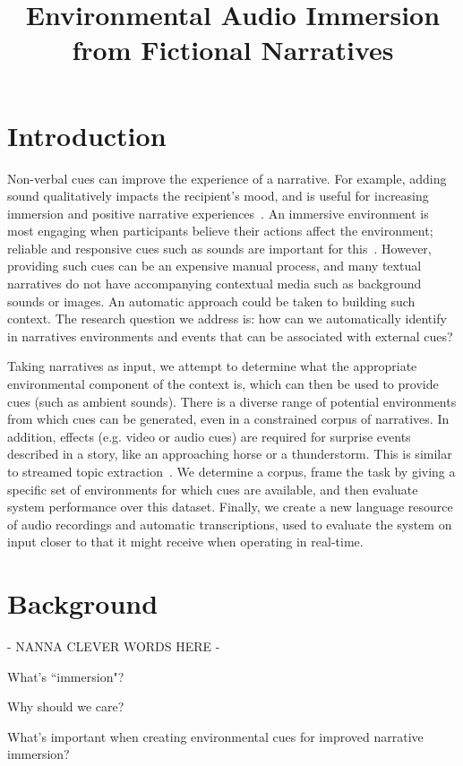 \documentclass[10pt,a4paper]{article}
\title{Environmental Audio Immersion from Fictional Narratives}
\begin{document}
\maketitleabstract

\section{Introduction}

Non-verbal cues can improve the experience of a narrative. 
For example, adding sound qualitatively impacts the recipient's mood, and is useful for increasing immersion and positive narrative experiences~\cite{ermi2005fundamental,madden2009collaborative,huiberts2010captivating}.
An immersive environment is most engaging when participants believe their actions affect the environment; reliable and responsive cues such as sounds are important for this~\cite{bobick1999kidsroom}.
However, providing such cues can be an expensive manual process, and many textual narratives do not have accompanying contextual media such as background sounds or images.
An automatic approach could be taken to building such context.
The research question we address is: how can we automatically identify in narratives environments and events that can be associated with external cues?

Taking narratives as input, we attempt to determine what the appropriate environmental component of the context is, which can then be used to provide cues (such as ambient sounds).
There is a diverse range of potential environments from which cues can be generated, even in a constrained corpus of narratives.
In addition, effects (e.g. video or audio cues) are required for surprise events described in a story, like an approaching horse or a thunderstorm.
This is similar to streamed topic extraction~\cite{allan2002introduction,preotiuc2012trendminer}.
We determine a corpus, frame the task by giving a specific set of environments for which cues are available, and then evaluate system performance over this dataset.
Finally, we create a new language resource of audio recordings and automatic transcriptions, used to evaluate the system on input closer to that it might receive when operating in real-time.


\section{Background}

- NANNA CLEVER WORDS HERE - 

What's ``immersion"?

Why should we care?

What's important when creating environmental cues for improved narrative immersion?
\end{document}
